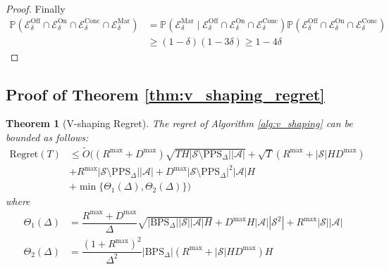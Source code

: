 \documentclass[twoside]{article}
\newtheorem{theorem}{Theorem}
\newcommand{\BPS}{\mathrm{BPS}_{\Delta}} %
\newcommand{\PPS}{\mathrm{PPS}_{\Delta}} %
\begin{document}
\begin{proof}
Finally 
\begin{align*}
    \mathbb{P}\left (\mathcal{E}^{\mathrm{Off}}_\delta\cap \mathcal{E}^{\mathrm{On}}_\delta \cap \mathcal{E}^{\mathrm{Conc}}_\delta \cap \mathcal{E}^{\mathrm{Mar}}_\delta \right ) & = \mathbb{P}\left (\mathcal{E}^{\mathrm{Mar}}_\delta \mid \mathcal{E}^{\mathrm{Off}}_\delta\cap \mathcal{E}^{\mathrm{On}}_\delta \cap \mathcal{E}^{\mathrm{Conc}}_\delta  \right ) \mathbb{P}\left (\mathcal{E}^{\mathrm{Off}}_\delta\cap \mathcal{E}^{\mathrm{On}}_\delta \cap \mathcal{E}^{\mathrm{Conc}}_\delta \right ) \\
    & \geq (1-\delta)(1-3\delta) \geq 1 - 4\delta
\end{align*}

\end{proof}
\subsection{Proof of Theorem \ref{thm:v_shaping_regret}}
\begin{theorem}[V-shaping Regret]
    The regret of Algorithm \ref{alg:v_shaping} can be bounded as follows:
    \begin{align*}
    \mathrm{Regret}(T) & \leq \tilde O\Big(
(R^{\max}+D^{\max})\sqrt{T H |\mathcal{S}\setminus \PPS| |\mathcal{A}|}
+\sqrt{T}(R^{\max}+|\mathcal{S}| H D^{\max}) \\
& + R^{\max} |\mathcal{S}\setminus \PPS| |\mathcal{A}| + D^{\max} |\mathcal{S}\setminus \PPS|^2 |\mathcal{A}| H\\
& + \min\{\Theta_{1}(\Delta),\Theta_{2}(\Delta)\}
\Big)
\end{align*}
%
where
\begin{align*}
\Theta_{1}(\Delta)
&=\dfrac{R^{\max}+D^{\max}}{\Delta}\sqrt{|\BPS||\mathcal{S}| |\mathcal{A}|H} + D^{\max}H|\mathcal{A}||\mathcal{S}^2| + R^{\max}|\mathcal{S}||\mathcal{A|}\\
\Theta_{2}(\Delta)
&=\dfrac{(1 + R^{\max})^2}{\Delta^2}|\BPS|(R^{\max}+|\mathcal{S}| H D^{\max})H
\end{align*}
\end{theorem}
\end{document}
